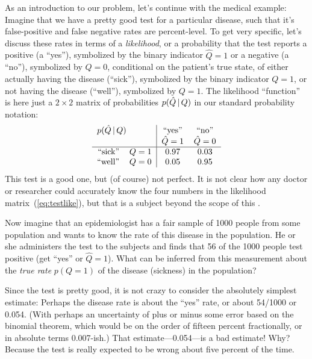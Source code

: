 \documentclass[12pt,twoside]{article}
\begin{document}
As an introduction to our problem, let's continue with the medical
example: Imagine that we have a pretty good test for a particular
disease, such that it's false-positive and false negative rates are
percent-level.  To get very specific, let's discuss these rates in
terms of a \emph{likelihood}, or a
probability that the test reports a positive (a ``yes''), symbolized
by the binary indicator $\hat{Q}=1$ or a negative (a ``no''),
symbolized by $\hat{Q}=0$, conditional on the patient's true state, of
either actually having the disease (``sick''), symbolized by the
binary indicator $Q=1$, or not having the disease (``well''),
symbolized by $Q=1$.  The likelihood ``function'' is here just a
$2\times 2$ matrix of probabilities $p(\hat{Q}\,|\, Q)$ in our
standard probability notation:
\begin{equation}\label{eq:testlike}
\mbox{\begin{tabular}{rc|cc}
\multicolumn{2}{l|}{$p(\hat{Q}\given Q)$}
               & ``yes'' & ``no'' \\
             & & $\hat{Q}=1$ & $\hat{Q}=0$ \\
\hline
``sick'' & $Q=1$ & $0.97$ & $0.03$ \\
``well'' & $Q=0$ & $0.05$ & $0.95$
\end{tabular}}
\end{equation}
This test is a good one, but (of course) not perfect.  It is not clear
how any doctor or researcher could accurately know the four numbers in
the likelihood matrix~(\ref{eq:testlike}), but that is a subject
beyond the scope of this \documentname.

Now imagine that an epidemiologist has a fair sample of 1000 people
from some population and wants to know the rate of this disease in the
population.  He or she administers the test to the subjects and finds
that 56 of the 1000 people test positive (get ``yes'' or $\hat{Q}=1$).
What can be inferred from this measurement about the \emph{true
  rate}  $p(Q=1)$ of the disease (sickness) in the
population?

Since the test is pretty good, it is not crazy to consider the
absolutely simplest estimate: Perhaps the disease rate is about the
``yes'' rate, or about 54/1000 or 0.054.  (With perhaps an uncertainty
of plus or minus some error based on the binomial theorem, which would
be on the order of fifteen percent fractionally, or in absolute terms
0.007-ish.)  That estimate---0.054---is a bad estimate!  Why?  Because
the test is really expected to be wrong about five percent of the time.
\end{document}
